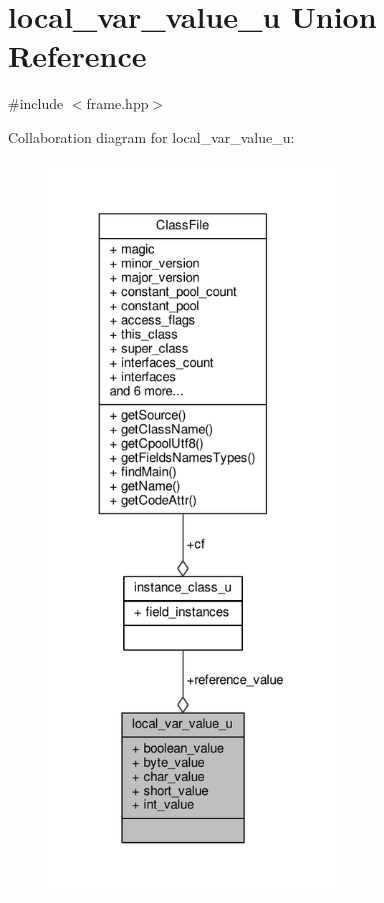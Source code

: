 \hypertarget{unionlocal__var__value__u}{\section{local\+\_\+var\+\_\+value\+\_\+u Union Reference}
\label{unionlocal__var__value__u}
}


{\ttfamily \#include $<$frame.\+hpp$>$}



Collaboration diagram for local\+\_\+var\+\_\+value\+\_\+u\+:\nopagebreak
\begin{figure}[H]
\begin{center}
\leavevmode
\includegraphics[height=550pt]{unionlocal__var__value__u__coll__graph}
\end{center}
\end{figure}
